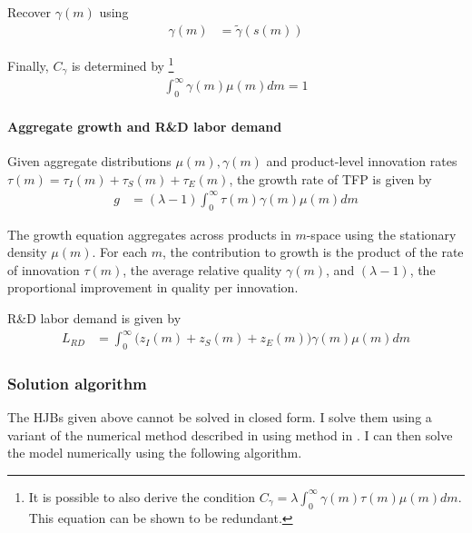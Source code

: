 \documentclass[12pt,english]{article}
\theoremstyle{remark}
\begin{document}
Recover $\gamma(m)$ using 
\begin{align}
\gamma(m) &= \tilde{\gamma}(s(m))
\end{align}

Finally, $C_{\gamma}$ is determined by \footnote{It is possible to also derive the condition $C_{\gamma} = \lambda \int_0^{\infty} \gamma(m) \tau(m) \mu(m) dm$. This equation can be shown to be redundant.}
\begin{align}
\int_0^{\infty} \gamma(m) \mu(m) dm = 1
\end{align}

\paragraph{Aggregate growth and R\&D labor demand}

Given aggregate distributions $\mu(m),\gamma(m)$ and product-level innovation rates $\tau(m) = \tau_I(m) + \tau_S(m) + \tau_E(m)$, the growth rate of TFP is given by
\begin{align}
g &= (\lambda -1) \int_0^{\infty} \tau(m) \gamma(m) \mu(m) dm 
\end{align}

The growth equation aggregates across products in $m$-space using the stationary density $\mu(m)$. For each $m$, the contribution to growth is the product of the rate of innovation $\tau(m)$, the average relative quality $\gamma(m)$, and $(\lambda -1)$, the proportional improvement in quality per innovation.

R\&D labor demand is given by 
\begin{align*}
L_{RD} &= \int_0^{\infty} \big (z_I(m) + z_S(m) + z_E(m)\big)\gamma(m)\mu(m) dm
\end{align*}

\subsubsection{Solution algorithm}\label{solution_algorithm}

The HJBs given above cannot be solved in closed form. I solve them using a variant of the numerical method described in using method in \cite{achdou_income_2017}. I can then solve the model numerically using the following algorithm.
\end{document}
